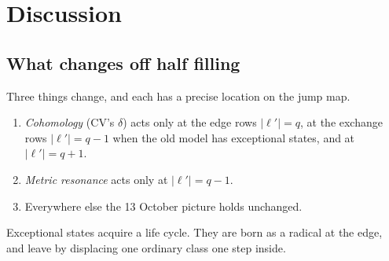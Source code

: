 \documentclass[11pt]{article}
\newcommand{\lp}{\ell'}
\theoremstyle{plain}
\theoremstyle{remark}
\numberwithin{equation}{section}
\begin{document}
\section{Discussion}\label{sec:discussion}

\subsection{What changes off half filling}
Three things change, and each has a precise location on the jump map.
\begin{enumerate}\itemsep1pt
\item \emph{Cohomology} (CV's $\delta$) acts only at the edge rows $|\lp|=q$, at the exchange rows $|\lp|=q-1$ when the
old model has exceptional states, and at $|\lp|=q+1$.
\item \emph{Metric resonance} acts only at $|\lp|=q-1$.
\item Everywhere else the 13 October picture holds unchanged.
\end{enumerate}
Exceptional states acquire a life cycle. They are born as a radical at the edge, and leave by displacing one ordinary
class one step inside.
\end{document}
